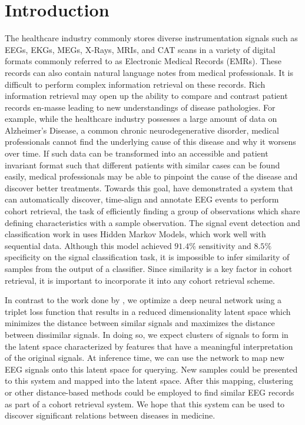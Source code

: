 \chapter{Introduction}
\vspace{-1cm}

The healthcare industry commonly stores diverse instrumentation signals such as EEGs, EKGs, MEGs, X-Rays, MRIs, and CAT scans in a variety of digital formats commonly referred to as Electronic Medical Records (EMRs).  These records can also contain natural language notes from medical professionals. It is difficult to perform complex information retrieval on these records. Rich information retrieval may open up the ability to compare and contrast patient records en-masse leading to new understandings of disease pathologies. For example, while the healthcare industry possesses a large amount of data on Alzheimer's Disease, a common chronic neurodegenerative disorder, medical professionals cannot find the underlying cause of this disease and why it worsens over time. If such data can be transformed into an accessible and patient invariant format such that different patients with similar cases can be found easily, medical professionals may be able to pinpoint the cause of the disease and discover better treatments. Towards this goal, \citet{piccone} have demonstrated a system that can automatically discover, time-align and annotate EEG events to perform cohort retrieval, the task of efficiently finding a group of observations which share defining characteristics with a sample observation. The signal event detection and classification work in \citet{piccone} uses Hidden Markov Models, which work well with sequential data. Although this model achieved $91.4\%$ sensitivity and $8.5\%$ specificity on the signal classification task, it is impossible to infer similarity of samples from the output of a classifier. Since similarity is a key factor in cohort retrieval, it is important to incorporate it into any cohort retrieval scheme.

In contrast to the work done by \citet{piccone}, we optimize a deep neural network using a triplet loss function that results in a reduced dimensionality latent space which minimizes the distance between similar signals and maximizes the distance between dissimilar signals. In doing so, we expect clusters of signals to form in the latent space characterized by features that have a meaningful interpretation of the original signals. At inference time, we can use the network to map new EEG signals onto this latent space for querying. New samples could be presented to this system and mapped into the latent space. After this mapping, clustering or other distance-based methods could be employed to find similar EEG records as part of a cohort retrieval system. We hope that this system can be used to discover significant relations between diseases in medicine.  

